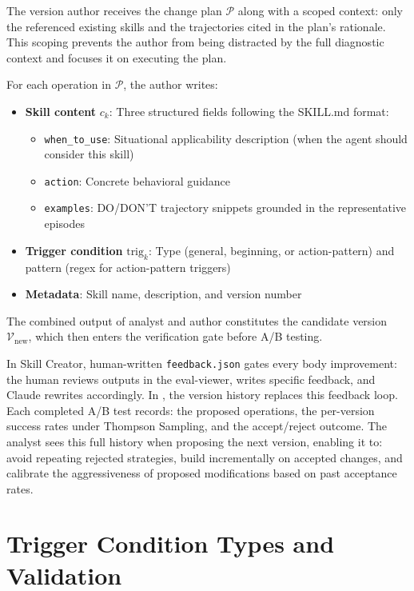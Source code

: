 \documentclass{article}
\theoremstyle{plain}
\theoremstyle{definition}
\theoremstyle{remark}
\begin{document}
The version author receives the change plan $\mathcal{P}$ along with a scoped context: only the referenced existing skills and the trajectories cited in the plan's rationale. This scoping prevents the author from being distracted by the full diagnostic context and focuses it on executing the plan.

For each operation in $\mathcal{P}$, the author writes:
\begin{itemize}[itemsep=2pt, leftmargin=*]
    \item \textbf{Skill content} $c_k$: Three structured fields following the SKILL.md format:
    \begin{itemize}[itemsep=1pt]
        \item \texttt{when\_to\_use}: Situational applicability description (when the agent should consider this skill)
        \item \texttt{action}: Concrete behavioral guidance
        \item \texttt{examples}: DO/DON'T trajectory snippets grounded in the representative episodes
    \end{itemize}
    \item \textbf{Trigger condition} $\text{trig}_k$: Type (general, beginning, or action-pattern) and pattern (regex for action-pattern triggers)
    \item \textbf{Metadata}: Skill name, description, and version number
\end{itemize}

The combined output of analyst and author constitutes the candidate version $\mathcal{V}_{\text{new}}$, which then enters the verification gate before A/B testing.

In Skill Creator, human-written \texttt{feedback.json} gates every body improvement: the human reviews outputs in the eval-viewer, writes specific feedback, and Claude rewrites accordingly. In \ours, the version history replaces this feedback loop. Each completed A/B test records: the proposed operations, the per-version success rates under Thompson Sampling, and the accept/reject outcome. The analyst sees this full history when proposing the next version, enabling it to: avoid repeating rejected strategies, build incrementally on accepted changes, and calibrate the aggressiveness of proposed modifications based on past acceptance rates.

\section{Trigger Condition Types and Validation}
\label{app:triggers}
\end{document}

